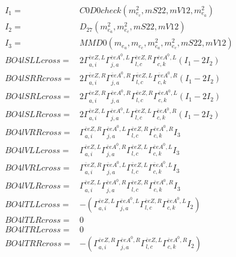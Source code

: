 \documentclass[A4,landscape]{article}
\begin{document}
\begin{align} 
I_1 = & C0D0check(m^2_{e_{{c}}}, mS22, mV12, m^2_{e_{{a}}}) \\ 
I_2 = & D_{27}(m^2_{e_{{a}}}, m^2_{e_{{c}}}, mS22, mV12) \\ 
I_3 = & MMD0(m_{e_{{a}}}, m_{e_{{c}}}, m^2_{e_{{a}}}, m^2_{e_{{c}}}, mS22, mV12) \\ 
  BO4lSLLcross= & 2  \Gamma^{\bar{e}e Z ,L}_{a, i} \Gamma^{\bar{e}e A^0 ,L}_{j, a} \Gamma^{\bar{e}e Z ,R}_{l, c} \Gamma^{\bar{e}e A^0 ,L}_{c, k} (I_1 - 2 I_2) \\ 
  BO4lSRRcross= & 2  \Gamma^{\bar{e}e Z ,R}_{a, i} \Gamma^{\bar{e}e A^0 ,R}_{j, a} \Gamma^{\bar{e}e Z ,L}_{l, c} \Gamma^{\bar{e}e A^0 ,R}_{c, k} (I_1 - 2 I_2) \\ 
  BO4lSRLcross= & 2  \Gamma^{\bar{e}e Z ,R}_{a, i} \Gamma^{\bar{e}e A^0 ,R}_{j, a} \Gamma^{\bar{e}e Z ,R}_{l, c} \Gamma^{\bar{e}e A^0 ,L}_{c, k} (I_1 - 2 I_2) \\ 
  BO4lSLRcross= & 2  \Gamma^{\bar{e}e Z ,L}_{a, i} \Gamma^{\bar{e}e A^0 ,L}_{j, a} \Gamma^{\bar{e}e Z ,L}_{l, c} \Gamma^{\bar{e}e A^0 ,R}_{c, k} (I_1 - 2 I_2) \\ 
  BO4lVRRcross= &  \Gamma^{\bar{e}e Z ,R}_{a, i} \Gamma^{\bar{e}e A^0 ,L}_{j, a} \Gamma^{\bar{e}e Z ,R}_{l, c} \Gamma^{\bar{e}e A^0 ,R}_{c, k} I_3 \\ 
  BO4lVLLcross= &  \Gamma^{\bar{e}e Z ,L}_{a, i} \Gamma^{\bar{e}e A^0 ,R}_{j, a} \Gamma^{\bar{e}e Z ,L}_{l, c} \Gamma^{\bar{e}e A^0 ,L}_{c, k} I_3 \\ 
  BO4lVRLcross= &  \Gamma^{\bar{e}e Z ,R}_{a, i} \Gamma^{\bar{e}e A^0 ,L}_{j, a} \Gamma^{\bar{e}e Z ,L}_{l, c} \Gamma^{\bar{e}e A^0 ,L}_{c, k} I_3 \\ 
  BO4lVLRcross= &  \Gamma^{\bar{e}e Z ,L}_{a, i} \Gamma^{\bar{e}e A^0 ,R}_{j, a} \Gamma^{\bar{e}e Z ,R}_{l, c} \Gamma^{\bar{e}e A^0 ,R}_{c, k} I_3 \\ 
  BO4lTLLcross= & -( \Gamma^{\bar{e}e Z ,L}_{a, i} \Gamma^{\bar{e}e A^0 ,L}_{j, a} \Gamma^{\bar{e}e Z ,R}_{l, c} \Gamma^{\bar{e}e A^0 ,L}_{c, k} I_2) \\ 
  BO4lTLRcross= & 0 \\ 
  BO4lTRLcross= & 0 \\ 
  BO4lTRRcross= & -( \Gamma^{\bar{e}e Z ,R}_{a, i} \Gamma^{\bar{e}e A^0 ,R}_{j, a} \Gamma^{\bar{e}e Z ,L}_{l, c} \Gamma^{\bar{e}e A^0 ,R}_{c, k} I_2) \\ 
\end{align} 
\end{document}
